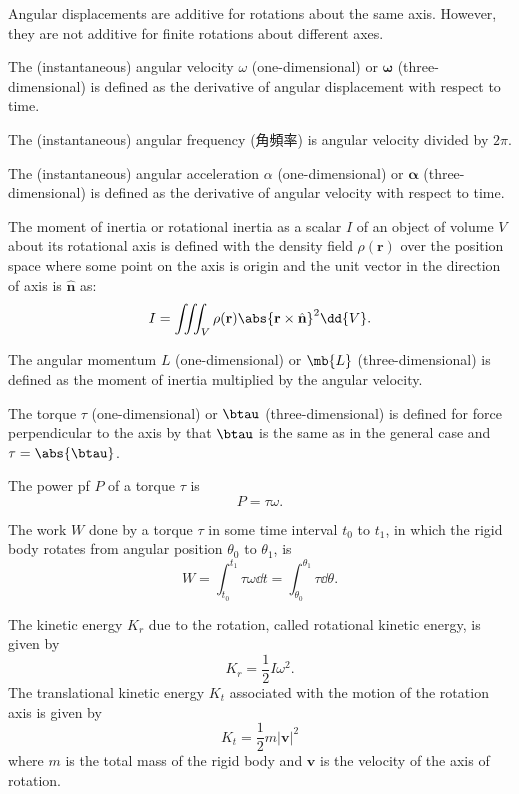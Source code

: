 \documentclass[a4paper,12pt]{article}
\begin{document}
Angular displacements are additive for rotations about the same axis. However, they are not additive for finite rotations about different axes.

The (instantaneous) angular velocity $\omega$ (one-dimensional) or $\boldsymbol{\omega}$ (three-dimensional) is defined as the derivative of angular displacement with respect to time.

The (instantaneous) angular frequency (角頻率) is angular velocity divided by $2\pi$.

The (instantaneous) angular acceleration $\alpha$ (one-dimensional) or $\boldsymbol{\alpha}$ (three-dimensional) is defined as the derivative of angular velocity with respect to time.

The moment of inertia or rotational inertia as a scalar $I$ of an object of volume $V$ about its rotational axis is defined with the density field $\rho(\mathbf{r})$ over the position space where some point on the axis is origin and the unit vector in the direction of axis is $\hat{\mathbf{n}}$ as:
\[I=\iiint_V\rho(\mathbf{r})\abs{\mathbf{r}\times\hat{\mathbf{n}}}^2\dd{V}.\]

The angular momentum $L$ (one-dimensional) or $\mb{L}$ (three-dimensional) is defined as the moment of inertia multiplied by the angular velocity.

The torque $\tau$ (one-dimensional) or $\btau$ (three-dimensional) is defined for force perpendicular to the axis by that $\btau$ is the same as in the general case and $\tau=\abs{\btau}$.

The power pf $P$ of a torque $\tau$ is
\[P=\tau\omega.\]

The work $W$ done by a torque $\tau$ in some time interval $t_0$ to $t_1$, in which the rigid body rotates from angular position $\theta_0$ to $\theta_1$, is
\[W=\int_{t_0}^{t_1}\tau\omega\dd{t}=\int_{\theta_0}^{\theta_1}\tau\dd{\theta}.\]

The kinetic energy $K_r$ due to the rotation, called rotational kinetic energy, is given by
\[K_r=\frac{1}{2}I\omega^2.\]
The translational kinetic energy $K_t$ associated with the motion of the rotation axis is given by
\[K_t=\frac{1}{2}m|\mathbf{v}|^2\]
where $m$ is the total mass of the rigid body and $\mathbf{v}$ is the velocity of the axis of rotation.
\end{document}
